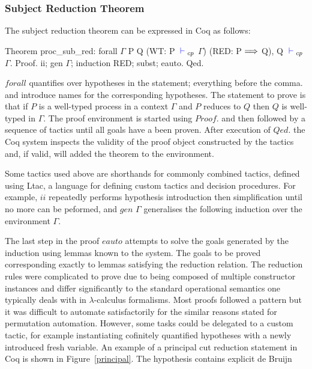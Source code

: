 \subsubsection{Subject Reduction Theorem}

The subject reduction theorem can be expressed in Coq as follows:
\begin{coq}
Theorem proc_sub_red:
  forall $\Gamma$ P Q
         (WT: P ${\color{blue} {} \vdash {}}_{cp}$ $\Gamma$)
         (RED: P $\Longrightarrow$ Q),
    Q ${\color{blue} {} \vdash {}}_{cp}$ $\Gamma$.
Proof. ii; gen $\Gamma$; induction RED; subst; eauto. Qed.
\end{coq}

\coqe$forall$ quantifies over hypotheses in the statement; everything before
the comma.  and  introduce names for the corresponding
hypotheses. The statement to prove is that if \coqe$P$ is a well-typed process
in a context $\Gamma$ and \coqe$P$ reduces to \coqe$Q$ then \coqe$Q$ is
well-typed in $\Gamma$. The proof environment is started using \coqe$Proof.$
and then followed by a sequence of tactics until all goals have a been
proven. After execution of \coqe$Qed.$ the Coq system inspects the validity of
the proof object constructed by the tactics and, if valid, will added the
theorem to the environment.

Some tactics used above are shorthands for commonly combined tactics, defined
using Ltac, a language for defining custom tactics and decision
procedures. For example, \coqe$ii$ repeatedly performs hypothesis introduction
then simplification until no more can be peformed, and \coqe$gen$ $\Gamma$
generalises the following induction over the environment $\Gamma$.



The last step in the proof \coqe$eauto$ attempts to solve the goals generated
by the induction using lemmas known to the system. The goals to be proved
corresponding exactly to lemmas satisfying the reduction relation. The
reduction rules were complicated to prove due to being composed of multiple
constructor instances and differ significantly to the standard operational
semantics one typically deals with in $\lambda$-calculus formalisms. Most
proofs followed a pattern but it was difficult to automate satisfactorily for
the similar reasons stated for permutation automation. However, some tasks
could be delegated to a custom tactic, for example instantiating cofinitely
quantified hypotheses with a newly introduced fresh variable. An example of a
principal cut reduction statement in Coq is shown in Figure~\ref{principal}.
The hypothesis contains explicit de Bruijn 

